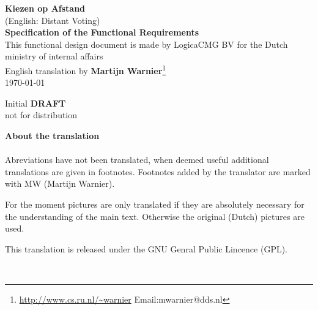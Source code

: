 \documentclass[11pt]{book}
\begin{document}
\begin{titlepage}
\renewcommand{\thefootnote}{\fnsymbol{footnote}}

\hspace{2pt}
\vspace{120pt}
\begin{center}
{\LARGE {\bf Kiezen op Afstand}\\
	{\normalsize (English: Distant Voting)}\\
	{\bf Specification of the Functional Requirements}\\
	\smallskip}
	This functional design document is made by LogicaCMG BV 
        for the Dutch ministry of internal affairs\\
\vspace{20pt}
English translation by {\bf Martijn Warnier}\footnote{
\url{http://www.cs.ru.nl/~warnier}\hspace{10pt}
Email:mwarnier@dds.nl}  \\
\today
\end{center}
\vspace{3cm}
\begin{center}
{\LARGE Initial {\bf DRAFT} \\
\vspace{1cm}
not for distribution}
\end{center}
\end{titlepage} 

\noindent \textbf{About the translation}\\ 
\\ 
\noindent Abreviations have not been
translated, when deemed useful additional translations are given in
footnotes. Footnotes added by the translator are marked with MW
(Martijn Warnier).

\noindent For the moment pictures are only translated if they are 
absolutely necessary for the understanding of the main text. Otherwise
the original (Dutch) pictures are used.

\noindent This translation is released under the 
GNU Genral Public Lincence (GPL).\\
\vspace{2cm}

\\

\tableofcontents

\listoffigures    












\appendix





\end{document}
